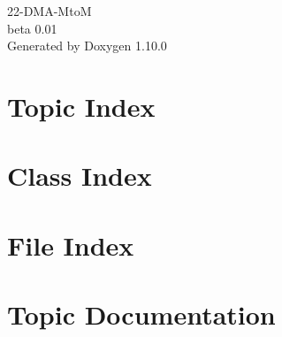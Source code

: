 \documentclass[twoside]{book}
\newcommand{\+}{\discretionary{\mbox{\scriptsize$\hookleftarrow$}}{}{}}
\newcommand{\clearemptydoublepage}{%
    \newpage{\pagestyle{empty}\cleardoublepage}%
  }
\begin{document}
  \raggedbottom
    \hypersetup{pageanchor=false,
                bookmarksnumbered=true,
                pdfencoding=unicode
               }
  \begin{titlepage}
  \vspace*{7cm}
  \begin{center}%
  {\Large 22-\/\+DMA-\/\+MtoM}\\
  [1ex]\large beta 0.\+01 \\
  \vspace*{1cm}
  {\large Generated by Doxygen 1.10.0}\\
  \end{center}
  \end{titlepage}
  \clearemptydoublepage
  \tableofcontents
  \clearemptydoublepage
  \hypersetup{pageanchor=true}

\chapter{Topic Index}

\chapter{Class Index}

\chapter{File Index}

\chapter{Topic Documentation}






\end{document}
